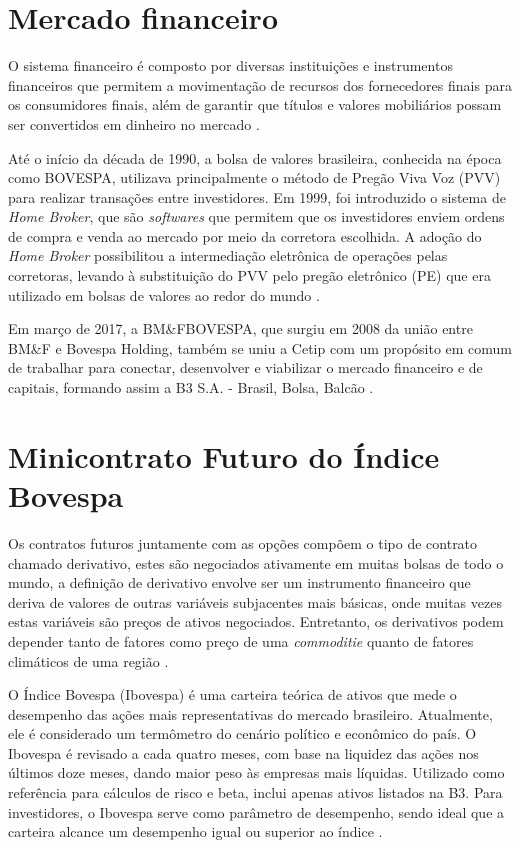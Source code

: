 \documentclass{iftex2024}
\begin{document}
\section{Mercado financeiro}

O sistema financeiro é composto por diversas instituições e instrumentos financeiros que permitem a movimentação de recursos dos fornecedores finais para os consumidores
finais, além de garantir que títulos e valores mobiliários possam ser convertidos em dinheiro
no mercado \cite{cavalcante2009mercado}.

Até o início da década de 1990, a bolsa de valores brasileira, conhecida na
época como BOVESPA, utilizava principalmente o método de Pregão Viva Voz (PVV)
para realizar transações entre investidores. Em 1999, foi introduzido o sistema de 
\textit{Home Broker}, que são \textit{softwares} que permitem que os investidores enviem ordens de compra e venda ao
mercado por meio da corretora escolhida. A adoção do \textit{Home Broker} possibilitou a
intermediação eletrônica de operações pelas corretoras, levando à substituição do PVV
pelo pregão eletrônico (PE) que era utilizado em bolsas de valores ao redor do mundo
\cite{nametala2017construccao}.

Em março de 2017, a BM\&FBOVESPA, que surgiu em 2008 da união entre
BM\&F e Bovespa Holding, também se uniu a Cetip com um propósito em comum de
trabalhar para conectar, desenvolver e viabilizar o mercado financeiro e de capitais,
formando assim a B3 S.A. - Brasil, Bolsa, Balcão \cite{B3}.

\section{Minicontrato Futuro do Índice Bovespa}

Os contratos futuros juntamente com as opções compõem o tipo de contrato chamado derivativo, estes são
negociados ativamente em muitas bolsas de todo o mundo, a definição de derivativo envolve
ser um instrumento financeiro que deriva de valores de outras variáveis subjacentes mais
básicas, onde muitas vezes estas variáveis são preços de ativos negociados. Entretanto, os
derivativos podem depender tanto de fatores como preço de uma \textit{commoditie} quanto de
fatores climáticos de uma região \cite{hull2016opccoes}.

O Índice Bovespa (Ibovespa) é uma carteira teórica de ativos que mede o
desempenho das ações mais representativas do mercado brasileiro. Atualmente, ele é
considerado um termômetro do cenário político e econômico do país. O Ibovespa é revisado
a cada quatro meses, com base na liquidez das ações nos últimos doze meses, dando maior
peso às empresas mais líquidas. Utilizado como referência para cálculos de risco e beta,
inclui apenas ativos listados na B3. Para investidores, o Ibovespa
serve como parâmetro de desempenho, sendo ideal que a carteira alcance um desempenho
igual ou superior ao índice \cite{nunes2020relaccao}.
\end{document}
